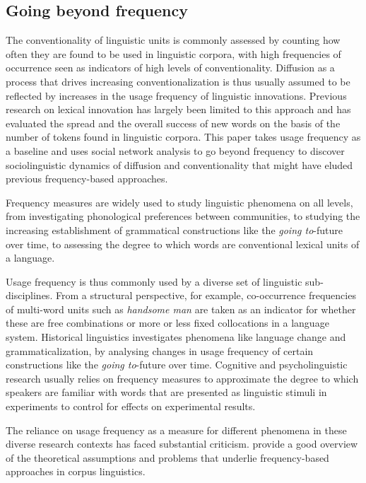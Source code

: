 \documentclass[
  a4paper,
  abstract=on,
  captions=tableabove
  ]{scrartcl}
\begin{document}
  \subsection{Going beyond frequency}
    \label{subsec:beyond-freq}

    The conventionality of linguistic units is commonly assessed by counting how often they are found to be used in linguistic corpora, with high frequencies of occurrence seen as indicators of high levels of conventionality. Diffusion as a process that drives increasing conventionalization is thus usually assumed to be reflected by increases in the usage frequency of linguistic innovations. Previous research on lexical innovation has largely been limited to this approach and has evaluated the spread and the overall success of new words on the basis of the number of tokens found in linguistic corpora. This paper takes usage frequency as a baseline and uses social network analysis to go beyond frequency to discover sociolinguistic dynamics of diffusion and conventionality that might have eluded previous frequency-based approaches.

    Frequency measures are widely used to study linguistic phenomena on all levels, from investigating phonological preferences between communities, to studying the increasing establishment of grammatical constructions like the \emph{going to}-future over time, to assessing the degree to which words are conventional lexical units of a language.

    Usage frequency is thus commonly used by a diverse set of linguistic sub-disciplines. From a structural perspective, for example, co-occurrence frequencies of multi-word units such as \emph{handsome man} are taken as an indicator for whether these are free combinations or more or less fixed collocations in a language system. Historical linguistics investigates phenomena like language change and grammaticalization, by analysing changes in usage frequency of certain constructions like the \emph{going to}-future over time. Cognitive and psycholinguistic research usually relies on frequency measures to approximate the degree to which speakers are familiar with words that are presented as linguistic stimuli in experiments to control for effects on experimental results. 

    The reliance on usage frequency as a measure for different phenomena in these diverse research contexts has faced substantial criticism. \cite{Stefanowitsch2017CorpusbasedPerspective} provide a good overview of the theoretical assumptions and problems that underlie frequency-based approaches in corpus linguistics.
\end{document}
